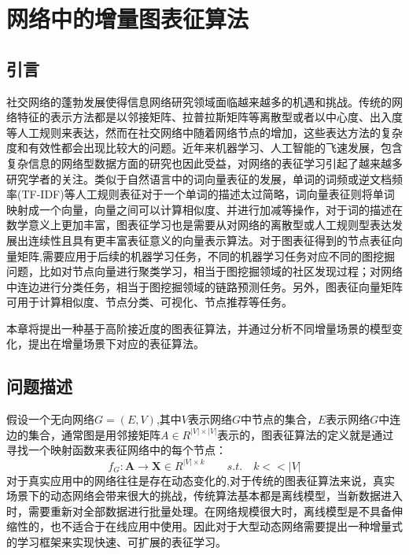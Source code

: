 \chapter{网络中的增量图表征算法}
\section{引言}
	社交网络的蓬勃发展使得信息网络研究领域面临越来越多的机遇和挑战。传统的网络特征的表示方法都是以邻接矩阵、拉普拉斯矩阵等离散型或者以中心度、出入度等人工规则来表达，然而在社交网络中随着网络节点的增加，这些表达方法的复杂度和有效性都会出现比较大的问题。近年来机器学习、人工智能的飞速发展，包含复杂信息的网络型数据方面的研究也因此受益，对网络的表征学习引起了越来越多研究学者的关注。类似于自然语言中的词向量表征的发展，单词的词频或逆文档频率(TF-IDF)等人工规则表征对于一个单词的描述太过简略，词向量表征则将单词映射成一个向量，向量之间可以计算相似度、并进行加减等操作，对于词的描述在数学意义上更加丰富，图表征学习也是需要从对网络的离散型或人工规则型表达发展出连续性且具有更丰富表征意义的向量表示算法。对于图表征得到的节点表征向量矩阵,需要应用于后续的机器学习任务，不同的机器学习任务对应不同的图挖掘问题，比如对节点向量进行聚类学习，相当于图挖掘领域的社区发现过程；对网络中连边进行分类任务，相当于图挖掘领域的链路预测任务。另外，图表征向量矩阵可用于计算相似度、节点分类、可视化、节点推荐等任务。
	
	本章将提出一种基于高阶接近度的图表征算法，并通过分析不同增量场景的模型变化，提出在增量场景下对应的表征算法。
	
\section{问题描述}
假设一个无向网络$G=(E,V)$,其中$V$表示网络$G$中节点的集合，$E$表示网络$G$中连边的集合，通常图是用邻接矩阵$A \in R^{|V|\times|V|}$表示的，图表征算法的定义就是通过寻找一个映射函数来表征网络中的每个节点：
\begin{equation}
f_G: \textbf{A} \rightarrow \textbf{X} \in R^{|V| \times k} \qquad s.t.\quad k<<|V|
\end{equation}
对于真实应用中的网络往往是存在动态变化的,对于传统的图表征算法来说，真实场景下的动态网络会带来很大的挑战，传统算法基本都是离线模型，当新数据进入时，需要重新对全部数据进行批量处理。在网络规模很大时，离线模型是不具备伸缩性的，也不适合于在线应用中使用。因此对于大型动态网络需要提出一种增量式的学习框架来实现快速、可扩展的表征学习。

